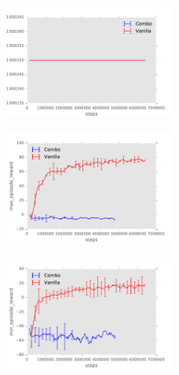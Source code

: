 \documentclass{sig-alternate}
\begin{document}
\begin{figure}
    \centering
    \includegraphics[width=0.5\textwidth]{../results/Boxing/Comparisons/Combo/Combo-baseline-learning_rate.pdf}
\end{figure}


\begin{figure}
    \centering
    \includegraphics[width=0.5\textwidth]{../results/Boxing/Comparisons/Combo/Combo-baseline-max_episode_reward.pdf}
\end{figure}


\begin{figure}
    \centering
    \includegraphics[width=0.5\textwidth]{../results/Boxing/Comparisons/Combo/Combo-baseline-min_episode_reward.pdf}
\end{figure}

\FloatBarrier
\end{document}
